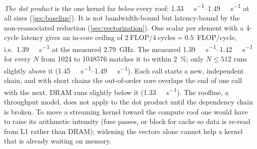 \emph{The dot product} is the one kernel far \emph{below} every roof:
\qtyrange{1.33}{1.49}{\giga\flop\per\second} at all sizes (\cref{sec:baseline}). It is not
bandwidth-bound but latency-bound by the non-reassociated reduction (\cref{sec:vectorization}). One
scalar  per element with a \num{4}-cycle latency gives an in-core ceiling of
$2~\text{FLOP}/4~\text{cycles} = 0.5$~FLOP/cycle, i.e.\ \qty{1.39}{\giga\flop\per\second} at the
measured \qty{2.79}{\giga\hertz}. The measured \qtyrange{1.39}{1.42}{\giga\flop\per\second} for every
$N$ from \num{1024} to \num{1048576} matches it to within \SI{2}{\percent}; only $N\le512$ runs slightly
above it (\qtyrange{1.45}{1.49}{\giga\flop\per\second}). Each call starts a new, independent chain,
and with short chains the out-of-order core overlaps the end of one call with the next. DRAM runs
slightly below it (\qty{1.33}{\giga\flop\per\second}). The roofline, a throughput model, does not apply to the dot
product until the dependency chain is broken. To move a streaming kernel toward the compute roof one
would have to raise its arithmetic intensity (fuse passes, or block for cache so data is re-read from
L1 rather than DRAM); widening the vectors alone cannot help a kernel that is already waiting on
memory.
